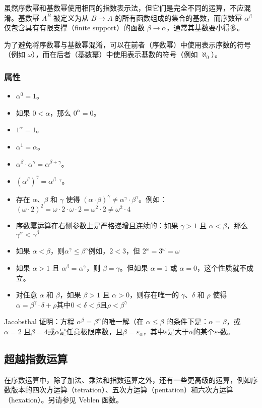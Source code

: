 虽然序数幂和基数幂使用相同的指数表示法，但它们是完全不同的运算，不应混淆。基数幂 \( A^B \) 被定义为从 \( B\to A \) 的所有函数组成的集合的基数，而序数幂 \(\alpha^\beta\) 仅包含具有有限支撑（finite support）的函数 \(\beta \to \alpha\)，通常其基数要小得多。

为了避免将序数幂与基数幂混淆，可以在前者（序数幂）中使用表示序数的符号（例如 \(\omega\)），而在后者（基数幂）中使用表示基数的符号（例如 \(\aleph_0\)）。
\subsubsection{属性}
\begin{itemize}
\item \(\alpha^0 = 1\)。
\item 如果 \(0 < \alpha\)，那么 \(0^\alpha = 0\)。
\item \(1^\alpha = 1\)。
\item \(\alpha^1 = \alpha\)。
\item \(\alpha^\beta \cdot \alpha^\gamma = \alpha^{\beta + \gamma}\)。
\item \((\alpha^\beta)^\gamma = \alpha^{\beta \cdot \gamma}\)。
\item 存在 \(\alpha\)、\(\beta\) 和 \(\gamma\) 使得 \((\alpha \cdot \beta)^\gamma \neq \alpha^\gamma \cdot \beta^\gamma\)。例如：\((\omega \cdot 2)^2 = \omega \cdot 2 \cdot \omega \cdot 2 = \omega^2 \cdot 2 \neq \omega^2 \cdot 4\)
\item 序数幂运算在右侧参数上是严格递增且连续的：如果 \(\gamma > 1\) 且 \(\alpha < \beta\)，那么\(\gamma^\alpha < \gamma^\beta\)
\item 如果 \(\alpha < \beta\)，则\(\alpha^\gamma \leq \beta^\gamma\)例如，\(2 < 3\)，但
\(2^\omega = 3^\omega = \omega\)
\item 如果 \(\alpha > 1\) 且 \(\alpha^\beta = \alpha^\gamma\)，则 \(\beta = \gamma\)。但如果 \(\alpha = 1\) 或 \(\alpha = 0\)，这个性质就不成立。
\item 对任意 \(\alpha\) 和 \(\beta\)，如果 \(\beta > 1\) 且 \(\alpha > 0\)，则存在唯一的 \(\gamma\)、\(\delta\) 和 \(\rho\) 使得\(\alpha = \beta^\gamma \cdot \delta + \rho\)其中\(0 < \delta < \beta\)且\(\rho < \beta^\gamma\)
\end{itemize}
Jacobsthal 证明：方程 \(\alpha^\beta = \beta^\alpha\)的唯一解（在 \(\alpha\leq\beta\) 的条件下是：\(\alpha = \beta\)，或\(\alpha = 2\) 且\(\beta = 4\)或\(\alpha\)是任意极限序数，且\(\beta=\varepsilon_\alpha\)，其中\(\varepsilon\)是大于\(\alpha\)的某个\(\varepsilon\)-数。
\subsection{超越指数运算}  
在序数运算中，除了加法、乘法和指数运算之外，还有一些更高级的运算，例如序数版本的四次方运算（tetration）、五次方运算（pentation）和六次方运算（hexation）。另请参见 Veblen 函数。
